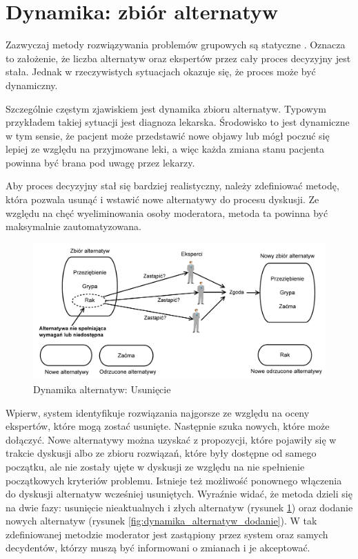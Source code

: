 \section{Dynamika: zbiór alternatyw}
Zazwyczaj metody rozwiązywania problemów grupowych są statyczne
\cite{Perez2010}. Oznacza to założenie, że liczba alternatyw oraz ekspertów
przez cały proces decyzyjny jest stała. Jednak w rzeczywistych sytuacjach
okazuje się, że proces może być dynamiczny.

Szczególnie częstym zjawiskiem jest dynamika zbioru alternatyw. Typowym 
przykładem takiej sytuacji jest diagnoza lekarska. Środowisko to jest dynamiczne
w tym sensie, że pacjent może przedstawić nowe objawy lub mógł poczuć się lepiej
ze względu na przyjmowane leki, a więc każda zmiana stanu pacjenta powinna być 
brana pod uwagę przez lekarzy.

Aby proces decyzyjny stał się bardziej realistyczny, należy zdefiniować metodę, 
która pozwala usunąć i wstawić nowe alternatywy do procesu dyskusji. Ze względu 
na chęć wyeliminowania osoby moderatora, metoda ta powinna być maksymalnie 
zautomatyzowana.

\begin{figure}[ht]
  \includegraphics[width=\linewidth]
  	{chapters/modelinggroupdecision/usuniecie_alternatyw-eps-converted-to.pdf}
  \caption{Dynamika alternatyw: Usunięcie}
  \label{fig:dynamika_alternatyw_usuniecie}
\end{figure}

Wpierw, system identyfikuje rozwiązania najgorsze ze względu na oceny ekspertów,
które mogą zostać usunięte. Następnie szuka nowych, które może dołączyć. Nowe 
alternatywy można uzyskać z propozycji, które pojawiły się w trakcie dyskusji 
albo ze zbioru rozwiązań, które były dostępne od samego początku, ale nie 
zostały ujęte w dyskusji ze względu na nie spełnienie początkowych kryteriów 
problemu. Istnieje też możliwość ponownego włączenia do dyskusji alternatyw 
wcześniej usuniętych. Wyraźnie widać, że metoda dzieli się na dwie fazy: 
usunięcie nieaktualnych i złych alternatyw (rysunek
\ref{fig:dynamika_alternatyw_usuniecie}) oraz dodanie nowych alternatyw (rysunek
\ref{fig:dynamika_alternatyw_dodanie}).
W tak zdefiniowanej metodzie moderator jest zastąpiony przez system oraz samych
decydentów, którzy muszą być informowani o zmianach i je akceptować.


